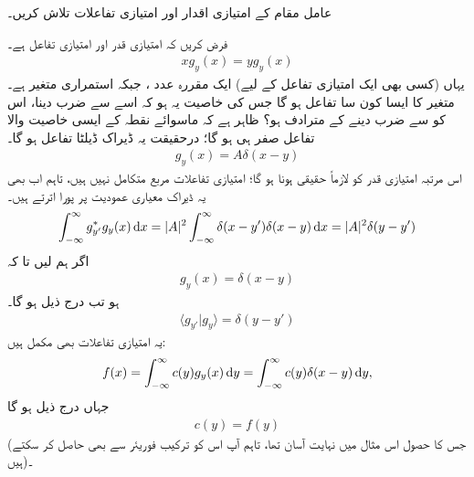 عامل مقام کے امتیازی اقدار اور امتیازی تفاعلات تلاش کریں۔

\quad
فرض کریں کہ  امتیازی قدر اور  امتیازی تفاعل ہے۔
\begin{align}
xg_{y}(x) = yg_{y}(x) 
\end{align}
یہاں (کسی بھی ایک امتیازی تفاعل کے لیے)  ایک مقررہ عدد ، جبکہ  استمراری متغیر ہے۔متغیر  کا ایسا کون سا تفاعل ہو گا جس کی خاصیت یہ ہو کہ اسے  سے ضرب دینا، اس کو  سے ضرب دینے کے مترادف ہو؟ ظاہر ہے کہ ماسوائے نقطہ  کے ایسی خاصیت والا تفاعل صفر ہی ہو گا؛ درحقیقت یہ ڈیراک ڈیلٹا تفاعل ہو گا۔
\begin{align*}
g_{y}(x) = A\delta(x-y)
\end{align*}
اس مرتبہ امتیازی قدر کو لازماً حقیقی ہونا ہو گا؛ امتیازی تفاعلات  مربع متکامل  نہیں ہیں، تاہم اب بھی یہ ڈیراک معیاری عمودیت پر پورا اترتے ہیں۔
\begin{align}
\int_{-\infty}^{\infty}g_{y'}^{*}g_{y}(x) \dif x = |A|^{2}\int_{-\infty}^{\infty}\delta(x-y')\delta(x-y) \dif x = |A|^{2} \delta (y-y')
\end{align}
اگر ہم  لیں تا کہ
\begin{align}\label{مساوات_قواعد_ڈیراک_استعمال}
g_{y}(x) = \delta (x-y)
\end{align}
ہو تب درج ذیل ہو گا۔
\begin{align}
\langle g_{y'} | g_{y} \rangle = \delta (y-y')
\end{align}
یہ امتیازی تفاعلات بھی مکمل ہیں:
\begin{align}
f(x) = \int_{-\infty}^{\infty} c(y)g_{y}(x) \dif y = \int_{-\infty}^{\infty} c(y)\delta(x-y)\dif y,
\end{align}
جہاں درج ذیل ہو گا
\begin{align}
c(y) = f(y)
\end{align}
(جس کا حصول اس مثال میں نہایت آسان تھا، تاہم آپ اس کو ترکیب فوریئر سے بھی حاصل کر سکتے ہیں)۔

